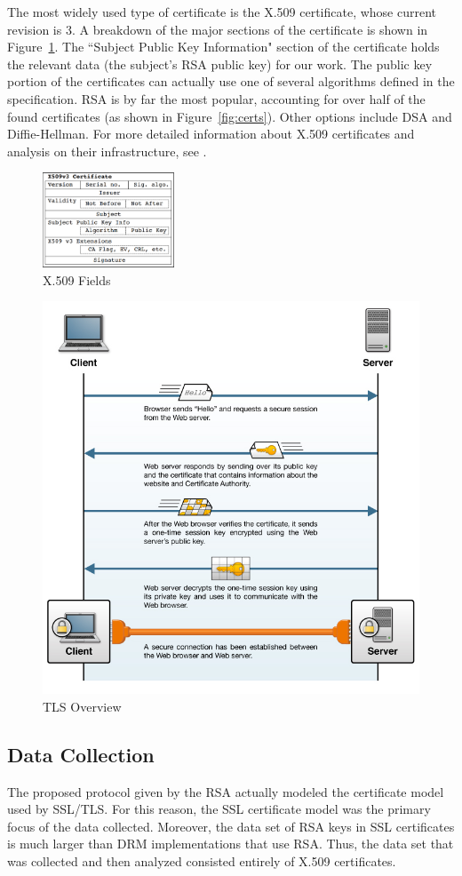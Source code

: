 \documentclass[smallextended]{svjour3}       %
\begin{document}
The most widely used type of certificate is the X.509 certificate, whose current
revision is 3. A breakdown of the major sections of the certificate is shown in
Figure~\ref{fig:x509}. The ``Subject Public Key Information" section of the
certificate holds the relevant data (the subject's RSA public key) for our work.
The public key portion of the certificates can actually use one of several
algorithms defined in the specification. RSA is by far the most popular,
accounting for over half of the found certificates (as shown in
Figure~\ref{fig:certs}). Other options include DSA and Diffie-Hellman. For more
detailed information about X.509 certificates and analysis on their
infrastructure, see \cite{holz2011ssl}.

\begin{figure}
   \centering
   \includegraphics[width=0.35\textwidth]{x509}
   \caption{X.509 Fields\cite{holz2011ssl}}
   \label{fig:x509}
\end{figure}

\begin{figure}
   \centering
   \includegraphics[width=0.5\linewidth]{tls}
   \caption{TLS Overview\cite{tlsconcepts}}
   \label{fig:tls}
\end{figure}

\subsection{Data Collection}
\label{subsec:datacol}
The proposed protocol given by the RSA actually modeled the certificate model
used by SSL/TLS. For this reason, the SSL certificate model was the primary
focus of the data collected. Moreover, the data set of RSA keys in SSL
certificates is much larger than DRM implementations that use RSA. Thus, the
data set that was collected and then analyzed consisted entirely of X.509
certificates.
\end{document}
